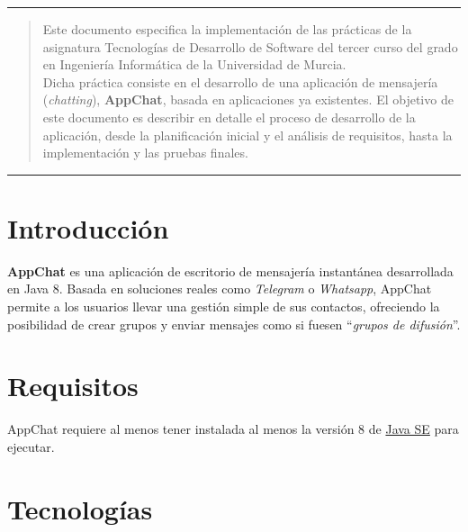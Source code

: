 \documentclass[11pt]{article}
\begin{document}
\thispagestyle{empty} %
\tableofcontents
\clearpage
\thispagestyle{empty} %
\listoffigures
\clearpage
\setcounter{page}{1}



\thispagestyle{empty}

\hrule
\vspace{-5.4ex}
\begin{abstract}
\vspace{1ex}
Este documento especifica la implementación de las prácticas de la asignatura Tecnologías de Desarrollo de Software del tercer curso del grado en Ingeniería Informática de la Universidad de Murcia.\\

Dicha práctica consiste en el desarrollo de una aplicación de mensajería (\textit{chatting}), \textbf{AppChat}, basada en aplicaciones ya existentes. El objetivo de este documento es describir en detalle el proceso de desarrollo de la aplicación, desde la planificación inicial y el análisis de requisitos, hasta la implementación y las pruebas finales.
\vspace{0.5ex}
\end{abstract}
\hrule
\vspace{4ex}

\section{Introducción}

\textbf{AppChat} es una aplicación de escritorio de mensajería instantánea desarrollada en Java 8. Basada en soluciones reales como \textit{Telegram} o \textit{Whatsapp}, AppChat permite a los usuarios llevar una gestión simple de sus contactos, ofreciendo la posibilidad de crear grupos y enviar mensajes como si fuesen ``\textit{grupos de difusión}''.

\section{Requisitos}

AppChat requiere al menos tener instalada al menos la versión 8 de \href{https://www.oracle.com/java/technologies/javase/javase8-archive-downloads.html}{Java SE} para ejecutar.

\section{Tecnologías}
\end{document}
